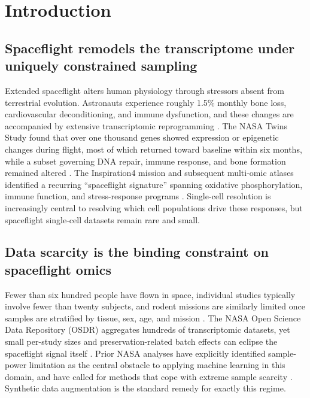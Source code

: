 \documentclass[11pt]{article}
\begin{document}
\section{Introduction}

\subsection{Spaceflight remodels the transcriptome under uniquely constrained sampling}
Extended spaceflight alters human physiology through stressors absent from terrestrial evolution. Astronauts experience roughly 1.5\% monthly bone loss, cardiovascular deconditioning, and immune dysfunction, and these changes are accompanied by extensive transcriptomic reprogramming \cite{twins}. The NASA Twins Study found that over one thousand genes showed expression or epigenetic changes during flight, most of which returned toward baseline within six months, while a subset governing DNA repair, immune response, and bone formation remained altered \cite{twins}. The Inspiration4 mission and subsequent multi-omic atlases identified a recurring ``spaceflight signature'' spanning oxidative phosphorylation, immune function, and stress-response programs \cite{i4}. Single-cell resolution is increasingly central to resolving which cell populations drive these responses, but spaceflight single-cell datasets remain rare and small.

\subsection{Data scarcity is the binding constraint on spaceflight omics}
Fewer than six hundred people have flown in space, individual studies typically involve fewer than twenty subjects, and rodent missions are similarly limited once samples are stratified by tissue, sex, age, and mission \cite{ilangovan,scott}. The NASA Open Science Data Repository (OSDR) aggregates hundreds of transcriptomic datasets, yet small per-study sizes and preservation-related batch effects can eclipse the spaceflight signal itself \cite{osdr}. Prior NASA analyses have explicitly identified sample-power limitation as the central obstacle to applying machine learning in this domain, and have called for methods that cope with extreme sample scarcity \cite{scott,ilangovan}. Synthetic data augmentation is the standard remedy for exactly this regime.
\end{document}
